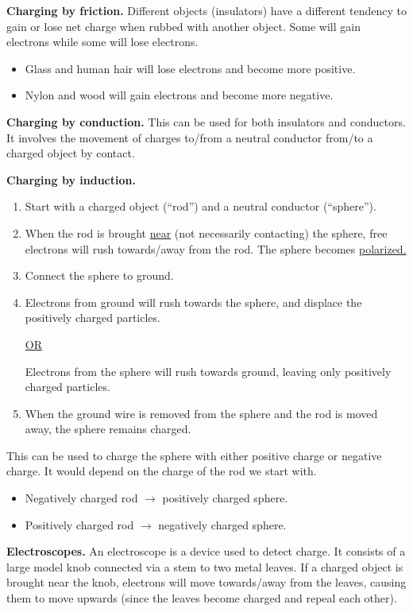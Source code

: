 \documentclass{article}
\begin{document}
\textbf{Charging by friction.} Different objects (insulators) have a different tendency to gain or lose net charge when rubbed with another object. Some will gain electrons while some will lose electrons.
\begin{itemize}
	\item Glass and human hair will lose electrons and become more positive.
	\item Nylon and wood will gain electrons and become more negative.
\end{itemize}

\textbf{Charging by conduction.} This can be used for both insulators and conductors. It involves the movement of charges to/from a neutral conductor from/to a charged object by contact.

\textbf{Charging by induction.} 
\begin{enumerate}
	\item Start with a charged object (``rod'') and a neutral conductor (``sphere'').
	\item When the rod is brought \ul{near} (not necessarily contacting) the sphere, free electrons will rush towards/away from the rod. The sphere becomes \ul{polarized.}
	\item Connect the sphere to ground.
	\item Electrons from ground will rush towards the sphere, and displace the positively charged particles.
	\begin{center}
		\ul{OR}
	\end{center}
	Electrons from the sphere will rush towards ground, leaving only positively charged particles.
	\item When the ground wire is removed from the sphere and the rod is moved away, the sphere remains charged.
\end{enumerate}
This can be used to charge the sphere with either positive charge or negative charge. It would depend on the charge of the rod we start with.
\begin{itemize}
	\item Negatively charged rod $\to$ positively charged sphere.
	\item Positively charged rod $\to$ negatively charged sphere.
\end{itemize}

\textbf{Electroscopes.} An electroscope is a device used to detect charge. It consists of a large model knob connected via a stem to two metal leaves. If a charged object is brought near the knob, electrons will move towards/away from the leaves, causing them to move upwards (since the leaves become charged and repeal each other).
\end{document}
